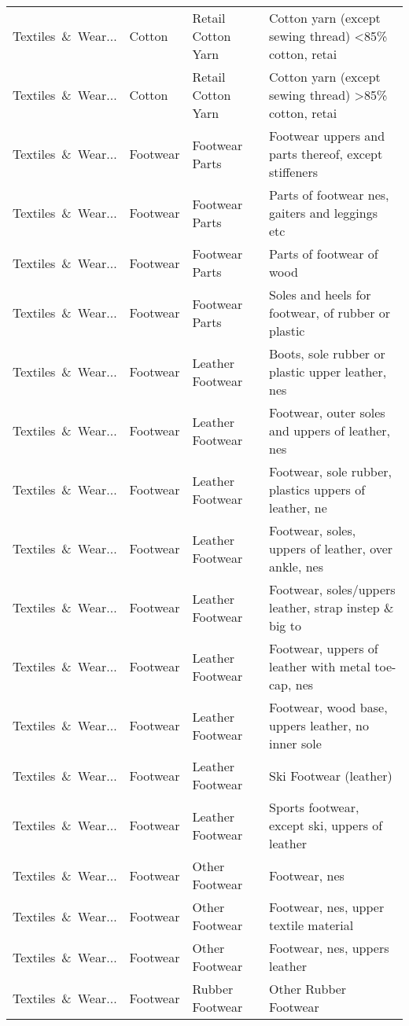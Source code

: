 \begin{appendices}
\begin{xltabular}{\textwidth}{|p{0.10\textwidth}|p{0.25\textwidth}|p{0.24\textwidth}|p{0.31\textwidth}|}
Textiles\ \&\ Wear... & Cotton & Retail Cotton Yarn & Cotton yarn (except sewing thread) <85\% cotton, retai \\
Textiles\ \&\ Wear... & Cotton & Retail Cotton Yarn & Cotton yarn (except sewing thread) >85\% cotton, retai \\
Textiles\ \&\ Wear... & Footwear & Footwear Parts & Footwear uppers and parts thereof, except stiffeners \\
Textiles\ \&\ Wear... & Footwear & Footwear Parts & Parts of footwear nes, gaiters and leggings etc \\
Textiles\ \&\ Wear... & Footwear & Footwear Parts & Parts of footwear of wood \\
Textiles\ \&\ Wear... & Footwear & Footwear Parts & Soles and heels for footwear, of rubber or plastic \\
Textiles\ \&\ Wear... & Footwear & Leather Footwear & Boots, sole rubber or plastic upper leather, nes \\
Textiles\ \&\ Wear... & Footwear & Leather Footwear & Footwear, outer soles and uppers of leather, nes \\
Textiles\ \&\ Wear... & Footwear & Leather Footwear & Footwear, sole rubber, plastics uppers of leather, ne \\
Textiles\ \&\ Wear... & Footwear & Leather Footwear & Footwear, soles, uppers of leather, over ankle, nes \\
Textiles\ \&\ Wear... & Footwear & Leather Footwear & Footwear, soles/uppers leather, strap instep \& big to \\
Textiles\ \&\ Wear... & Footwear & Leather Footwear & Footwear, uppers of leather with metal toe-cap, nes \\
Textiles\ \&\ Wear... & Footwear & Leather Footwear & Footwear, wood base, uppers leather, no inner sole \\
Textiles\ \&\ Wear... & Footwear & Leather Footwear & Ski Footwear (leather) \\
Textiles\ \&\ Wear... & Footwear & Leather Footwear & Sports footwear, except ski, uppers of leather \\
Textiles\ \&\ Wear... & Footwear & Other Footwear & Footwear, nes \\
Textiles\ \&\ Wear... & Footwear & Other Footwear & Footwear, nes, upper textile material \\
Textiles\ \&\ Wear... & Footwear & Other Footwear & Footwear, nes, uppers leather \\
Textiles\ \&\ Wear... & Footwear & Rubber Footwear & Other Rubber Footwear \\

\end{xltabular}
\end{appendices}

